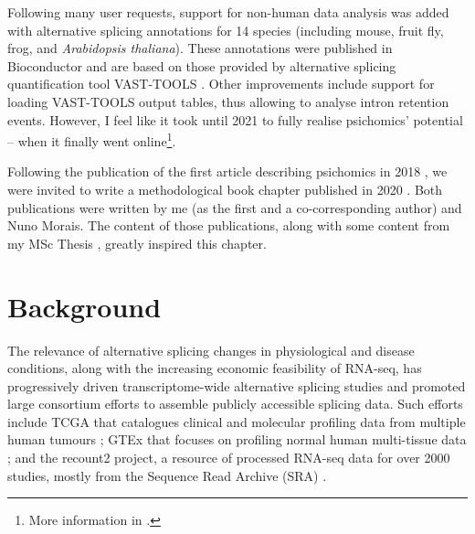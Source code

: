 Following many user requests, support for non-human data analysis was added with alternative splicing annotations for 14 species (including mouse, fruit fly, frog, and \emph{Arabidopsis thaliana}). These annotations were published in Bioconductor and are based on those provided by alternative splicing quantification tool VAST-TOOLS \cite{irimia:2014wt,tapial:2017ui}. Other improvements include support for loading VAST-TOOLS output tables, thus allowing to analyse intron retention events. However, I feel like it took until 2021 to fully realise psichomics' potential -- when it finally went online\footnote{More information in .}.

Following the publication of the first article describing psichomics in 2018 \cite{saraiva-agostinho:2018uq}, we were invited to write a methodological book chapter published in 2020 \cite{saraiva-agostinho:2020wz}. Both publications were written by me (as the first and a co-corresponding author) and Nuno Morais. The content of those publications, along with some content from my MSc Thesis \cite{saraiva-agostinho:2016vw}, greatly inspired this chapter.

\section{Background}


The relevance of alternative splicing changes in physiological and disease conditions, along with the increasing economic feasibility of RNA-seq, has progressively driven transcriptome-wide alternative splicing studies \cite{wang:2008wa,tsai:2015ve,danan-gotthold:2015ut,chhibber:2017wm,climente-gonzalez:2017uj} and promoted large consortium efforts to assemble publicly accessible splicing data. Such efforts include TCGA that catalogues clinical and molecular profiling data from multiple human tumours \cite{chang:2013ww}; GTEx that focuses on profiling normal human multi-tissue data \cite{lonsdale:2013uo}; and the recount2 project, a resource of processed RNA-seq data for over 2000 studies, mostly from the Sequence Read Archive (SRA) \cite{collado-torres:2017uw}.

